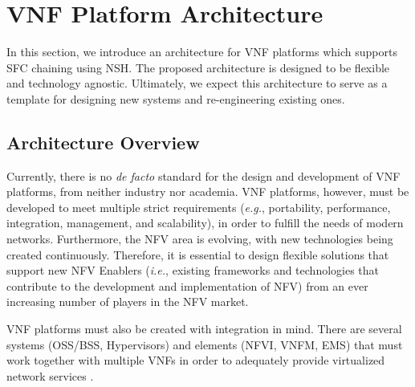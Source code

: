 \section{VNF Platform Architecture} \label{ARCH}

In this section, we introduce an architecture for VNF platforms which supports SFC chaining using NSH. The proposed architecture is designed to be flexible and technology agnostic. Ultimately, we expect this architecture to serve as a template for designing new systems and re-engineering existing ones.

\subsection{Architecture Overview}

Currently, there is no \textit{de facto} standard for the design and development of VNF platforms, from neither industry nor academia. VNF platforms, however, must be developed to meet multiple strict requirements (\textit{e.g.}, portability, performance, integration, management, and scalability), in order to fulfill the needs of modern networks. Furthermore, the NFV area is evolving, with new technologies being created continuously. Therefore, it is essential to design flexible solutions that support new NFV Enablers (\textit{i.e.}, existing frameworks and technologies that contribute to the development and implementation of NFV) from an ever increasing number of players in the NFV market.

VNF platforms must also be created with integration in mind. There are several systems (OSS/BSS, Hypervisors) and elements (NFVI, VNFM, EMS) that must work together with multiple VNFs in order to adequately provide virtualized network services \cite{GS-2014}.



